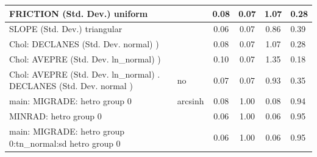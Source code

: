 \begin{table}
\begin{center}
\begin{tabular}{|l|l|c|c|c|l|}
			\hline
			FRICTION (Std. Dev.) uniform &  & 0.08 & 0.07 & 1.07 & 0.28 \\
			\hline
			SLOPE (Std. Dev.) triangular &  & 0.06 & 0.07 & 0.86 & 0.39 \\
			\hline
			 Chol: DECLANES (Std. Dev. normal) ) &  & 0.08 & 0.07 & 1.07 & 0.28 \\
			\hline
			 Chol: AVEPRE (Std. Dev. ln_normal) ) &  & 0.10 & 0.07 & 1.35 & 0.18 \\
			\hline
			 Chol: AVEPRE (Std. Dev. ln_normal) . DECLANES (Std. Dev.   normal ) & no & 0.07 & 0.07 & 0.93 & 0.35 \\
			\hline
			main: MIGRADE: hetro group 0 & arcsinh & 0.08 & 1.00 & 0.08 & 0.94 \\
			\hline
			MINRAD: hetro group 0 &  & 0.06 & 1.00 & 0.06 & 0.95 \\
			\hline
			main: MIGRADE: hetro group 0:tn_normal:sd  hetro group 0 &  & 0.06 & 1.00 & 0.06 & 0.95 \\
			\hline
		\end{tabular}
	\end{center}
\end{table}